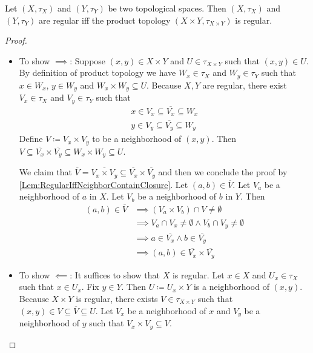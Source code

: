 \documentclass[screen,single]{techreport}
\numberwithin{equation}{section}
\begin{document}
\begin{theorem}\label{The:ProductOfRegularStillRegular}
	Let $(X,\tau_X)$ and $(Y,\tau_Y)$ be two topological spaces.
	Then $(X,\tau_X)$ and $(Y,\tau_Y)$ are regular iff the product topology $(X \times Y, \tau_{X \times Y})$ is regular.
\end{theorem}
\begin{proof}\
	\begin{itemize}
		\item To show ${\implies}$: Suppose $(x,y) \in X \times Y$ and $U \in \tau_{X \times Y}$ such that $(x,y) \in U$.
		By definition of product topology we have $W_x \in \tau_X$ and $W_y \in \tau_Y$ such that $x \in W_x$, $y \in W_y$ and $W_x \times W_y \subseteq U$.
		Because $X,Y$ are regular, there exist $V_x \in \tau_X$ and $V_y \in \tau_Y$ such that
		\begin{gather*}
			x \in V_x \subseteq \overline{V_x} \subseteq W_x \\
			y \in V_y \subseteq \overline{V_y} \subseteq W_y
		\end{gather*}
		Define $V \coloneqq V_x \times V_y$ to be a neighborhood of $(x,y)$.
		Then $V \subseteq \overline{V_x} \times \overline{V_y} \subseteq W_x \times W_y \subseteq U$.
		
		We claim that $\overline{V} = \overline{V_x \times V_y} \subseteq \overline{V_x} \times \overline{V_y} $ and then
		we conclude the proof by \cref{Lem:RegularIffNeighborContainClosure}.
		Let $(a,b) \in \overline{V}$.
		Let $V_a$ be a neighborhood of $a$ in $X$.
		Let $V_b$ be a neighborhood of $b$ in $Y$.
		Then
		\begin{align*}
			(a,b) \in \overline{V} & \implies (V_a \times V_b) \cap V \neq \emptyset \\
			& \implies V_a \cap V_x \neq \emptyset \wedge V_b \cap V_y \neq \emptyset \\
			& \implies a \in \overline{V_x} \wedge b \in \overline{V_y} \\
			& \implies (a,b) \in \overline{V_x} \times \overline{V_y}
		\end{align*}
		
		\item To show ${\impliedby}$: It suffices to show that $X$ is regular.
		Let $x \in X$ and $U_x \in \tau_X$ such that $x \in U_x$.
		Fix $y \in Y$. Then $U \coloneqq U_x \times Y$ is a neighborhood of $(x,y)$.
		Because $X \times Y$ is regular, there exists $V \in \tau_{X \times Y}$ such that $(x,y) \in V \subseteq \overline{V} \subseteq U$.
		Let $V_x$ be a neighborhood of $x$ and $V_y$ be a neighborhood of $y$ such that $V_x \times V_y \subseteq V$.
		

\end{itemize}
\end{proof}
\end{document}
